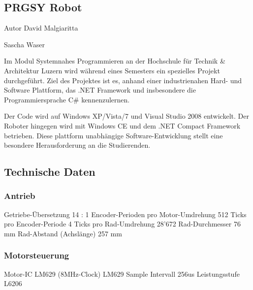 \begin{center}\section*{PRGSY Robot }\end{center} 

\begin{center}\end{center}  \begin{DoxyAuthor}{Autor}
David Malgiaritta 

Sascha Waser \par
\par
\par

\end{DoxyAuthor}
Im Modul Systemnahes Programmieren an der Hochschule f\"{u}r Technik \& Architektur Luzern wird w\"{a}hrend eines Semesters ein spezielles Projekt durchgef\"{u}hrt. Ziel des Projektes ist es, anhand einer industrienahen Hard-\/ und Software Plattform, das .NET Framework und insbesondere die Programmiersprache C\# kennenzulernen. \par
 Der Code wird auf Windows XP/Vista/7 und Visual Studio 2008 entwickelt. Der Roboter hingegen wird mit Windows CE und dem .NET Compact Framework betrieben. Diese plattform unabh\"{a}ngige Software-\/Entwicklung stellt eine besondere Herausforderung an die Studierenden.

\par
\subsection*{Technische Daten }

\subsubsection*{Antrieb }


\begin{DoxyPre}
 Getriebe-\"{U}bersetzung                     14 : 1
 Encoder-Perioden pro Motor-Umdrehung     512 
 Ticks pro Encoder-Periode                4 
 Ticks pro Rad-Umdrehung                  28'672 
 Rad-Durchmesser                          76 mm 
 Rad-Abstand (Achsl\"{a}nge)                  257 mm
 \end{DoxyPre}
 \subsubsection*{Motorsteuerung }


\begin{DoxyPre}
 Motor-IC                                 LM629 (8MHz-Clock)
 LM629 Sample Intervall                   256us
 Leistungsstufe                           L6206
 \end{DoxyPre}


 